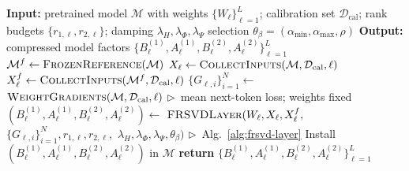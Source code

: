\begin{algorithm}[t]
\caption{FR-SVD: full compression pipeline}
\label{alg:layerwise}
\small
\begin{algorithmic}[1]
\State \textbf{Input:}\; pretrained model $\mathcal M$
\Statex \hspace{\algorithmicindent} with weights $\{W_\ell\}_{\ell=1}^{L}$;
\Statex \hspace{\algorithmicindent} calibration set $\mathcal D_{\mathrm{cal}}$;
\Statex \hspace{\algorithmicindent} rank budgets $\{r_{1,\ell},r_{2,\ell}\}$;
\Statex \hspace{\algorithmicindent} damping $\lambda_H,\lambda_\Phi,\lambda_\Psi$
\Statex \hspace{\algorithmicindent} selection $\theta_\beta=(\alpha_{\min},\alpha_{\max},\rho)$
\State \textbf{Output:}\; compressed model factors
\Statex \hspace{\algorithmicindent} $\{B_\ell^{(1)},A_\ell^{(1)},B_\ell^{(2)},A_\ell^{(2)}\}_{\ell=1}^{L}$
\State $\mathcal M^f\gets\textsc{FrozenReference}(\mathcal M)$
    \State $X_\ell\gets\Call{CollectInputs}{\mathcal M,\mathcal D_{\mathrm{cal}},\ell}$
    \State $X_\ell^f\gets\Call{CollectInputs}{\mathcal M^f,\mathcal D_{\mathrm{cal}},\ell}$
    \State $\{G_{\ell,i}\}_{i=1}^N \gets$
    \Statex \hspace{\algorithmicindent} $\Call{WeightGradients}{\mathcal M,\mathcal D_{\mathrm{cal}},\ell}$
    \Statex \hspace{\algorithmicindent} $\triangleright$~mean next-token loss; weights fixed
    \State $(B_\ell^{(1)},A_\ell^{(1)},B_\ell^{(2)},A_\ell^{(2)})\gets$
    \Statex \hspace{\algorithmicindent} $\textsc{FRSVDLayer}(W_\ell,X_\ell,X_\ell^f,$
    \Statex \hspace{\dimexpr\algorithmicindent+\algorithmicindent\relax} $\{G_{\ell,i}\}_{i=1}^N,r_{1,\ell},r_{2,\ell},$
    \Statex \hspace{\dimexpr\algorithmicindent+\algorithmicindent\relax} $\lambda_H,\lambda_\Phi,\lambda_\Psi,\theta_\beta)$
    \Statex \hspace{\algorithmicindent} $\triangleright$~Alg.~\ref{alg:frsvd-layer}
    \State Install $(B_\ell^{(1)},A_\ell^{(1)},B_\ell^{(2)},A_\ell^{(2)})$ in $\mathcal M$
\EndFor
\State \textbf{return} $\{B_\ell^{(1)}, A_\ell^{(1)}, B_\ell^{(2)}, A_\ell^{(2)}\}_{\ell=1}^{L}$
\end{algorithmic}
\end{algorithm}

